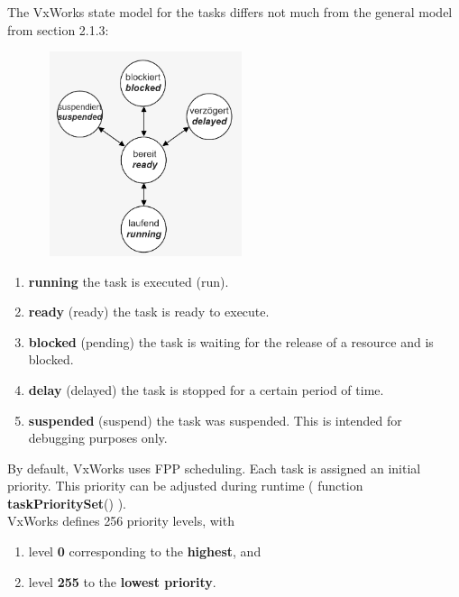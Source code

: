 The VxWorks state model for the tasks differs not much from the general model from section 2.1.3:

 	\begin{figure}[h]
    \centering
    \includegraphics[width=6cm, height=6cm]{Images/image128.png}
    \label{fig:Fig }
    \end{figure}

\begin{enumerate}
\item  \textbf{running} the task is executed (run).

\item  \textbf{ready} (ready) the task is ready to execute.

\item  \textbf{blocked} (pending) the task is waiting for the release of a resource and is blocked.

\item  \textbf{delay} (delayed) the task is stopped for a certain period of time.

\item  \textbf{suspended} (suspend) the task was suspended. This is intended for debugging purposes only.
\end{enumerate}

By default, VxWorks uses FPP scheduling. Each task is assigned an initial priority. This priority can be adjusted during runtime ( function \textbf{taskPrioritySet}() ).\\

VxWorks defines 256 priority levels, with 

\begin{enumerate}
\item  level \textbf{0} corresponding to the \textbf{highest}, and 

\item  level \textbf{255} to the \textbf{lowest priority}.
\end{enumerate}


